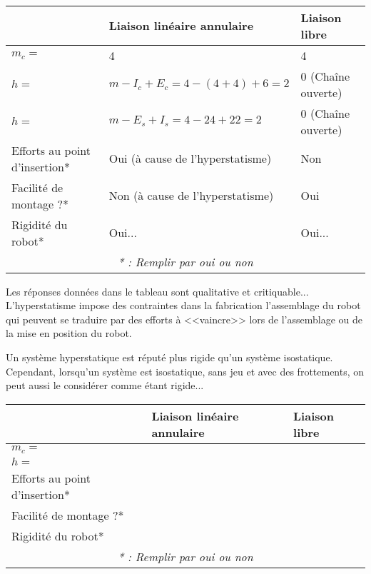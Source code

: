 
\ifprof


\begin{corrige} ~\\
\footnotesize
\begin{center}
\begin{tabular}{|p{2.2cm}|p{2cm}|p{2cm}|}
\hline
& Liaison linéaire annulaire & Liaison libre  \\
\hline
$m_c=$ & 4 & 4\\ \hline
$h=$ & $m-I_c+E_c = 4 - (4+4) + 6 = 2$ &0 (Chaîne ouverte)\\ 
$h=$ & $m-E_s+I_s = 4 - 24 + 22 = 2$ &0 (Chaîne ouverte)\\ 
 \hline
Efforts au point d'insertion* & Oui (à cause de l'hyperstatisme)& Non \\ \hline
Facilité de montage ?* & Non (à cause de l'hyperstatisme)& Oui \\ \hline
Rigidité du robot* & Oui... &  Oui...\\ \hline
\multicolumn{3}{c}{\textit{* : Remplir par oui ou non}}
\end{tabular}
\end{center}
\normalsize
Les réponses données dans le tableau sont qualitative et critiquable... L'hyperstatisme impose des contraintes dans la fabrication l'assemblage du robot qui peuvent se traduire par des efforts à <<vaincre>> lors de l'assemblage ou de la mise en position du robot. 

Un système hyperstatique est réputé plus rigide qu'un système isostatique. Cependant, lorsqu'un système est isostatique, sans jeu et avec des frottements, on peut aussi le considérer comme étant rigide...
\end{corrige}
\else


\footnotesize
\begin{center}
\begin{tabular}{|p{2.2cm}|p{2cm}|p{2cm}|}
\hline
& Liaison linéaire annulaire & Liaison libre  \\
\hline
$m_c=$ & & \\ \hline
$h=$ & & \\ \hline
Efforts au point d'insertion* & & \\ \hline
Facilité de montage ?* & & \\ \hline
Rigidité du robot* & & \\ \hline
\multicolumn{3}{c}{\textit{* : Remplir par oui ou non}}
\end{tabular}
\end{center}
\normalsize
\fi


